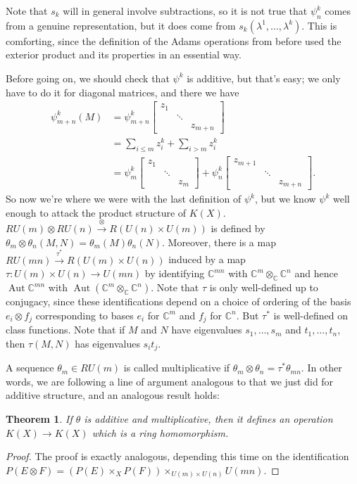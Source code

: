 \documentclass{article}
\newcommand{\C}{\mathbb{C}}
\DeclareMathOperator{\Aut}{Aut}
\newtheorem{thm}{Theorem}[section]
\begin{document}
Note that $s_k$ will in general involve subtractions, so it is not true that $\psi^k_n$ comes from a genuine representation, but it does come from $s_k(\lambda^1, \ldots, \lambda^k)$.  This is comforting, since the definition of the Adams operations from before used the exterior product and its properties in an essential way.

Before going on, we should check that $\psi^k$ is additive, but that's easy; we only have to do it for diagonal matrices, and there we have
\begin{align*}
\psi^k_{m+n}(M) & = \psi^k_{m+n} \left[ \begin{array}{ccc} z_1 \\ & \ddots \\ & & z_{m+n}\end{array} \right] \\
& = \sum_{i \le m} z_i^k + \sum_{i > m} z_i^k \\
& = \psi^k_m \left[ \begin{array}{ccc} z_1 \\ & \ddots \\ & & z_m\end{array}\right] + \psi^k_n \left[ \begin{array}{ccc}z_{m+1} \\ & \ddots \\ & & z_{m+n} \end{array} \right].
\end{align*}
So now we're where we were with the last definition of $\psi^k$, but we know $\psi^k$ well enough to attack the product structure of $K(X)$.  $RU(m) \otimes RU(n) \stackrel{\otimes}{\to} R(U(n) \times U(m))$ is defined by $\theta_m \otimes \theta_n(M, N) = \theta_m(M) \theta_n(N)$.  Moreover, there is a map $RU(mn) \stackrel{\tau^*}{\to} R(U(m) \times U(n))$ induced by a map $\tau: U(m) \times U(n) \to U(mn)$ by identifying $\C^{mn}$ with $\C^m \otimes_\C \C^n$ and hence $\Aut \C^{mn}$ with $\Aut (\C^m \otimes_\C \C^n)$.  Note that $\tau$ is only well-defined up to conjugacy, since these identifications depend on a choice of ordering of the basis $e_i \otimes f_j$ corresponding to bases $e_i$ for $\C^m$ and $f_j$ for $\C^n$.  But $\tau^*$ is well-defined on class functions.  Note that if $M$ and $N$ have eigenvalues $s_1, \ldots, s_m$ and $t_1, \ldots, t_n$, then $\tau(M, N)$ has eigenvalues $s_i t_j$.

A sequence $\theta_m \in RU(m)$ is called multiplicative if $\theta_m \otimes \theta_n = \tau^* \theta_{mn}$.  In other words, we are following a line of argument analogous to that we just did for additive structure, and an analogous result holds:
\begin{thm}
If $\theta$ is additive and multiplicative, then it defines an operation $K(X) \to K(X)$ which is a ring homomorphism.
\end{thm}
\begin{proof}
The proof is exactly analogous, depending this time on the identification $P(E \otimes F) = (P(E) \times_X P(F)) \times_{U(m) \times U(n)} U(mn)$.
\end{proof}
\end{document}

